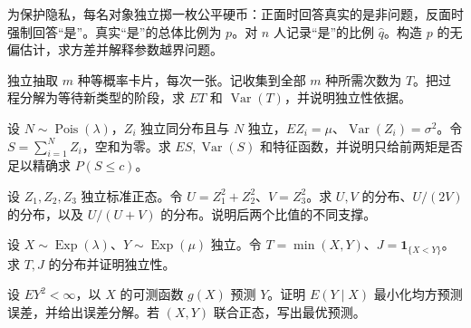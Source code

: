 \begin{exercise}[随机化回答的估计误差]\label{q:B17.3}
为保护隐私，每名对象独立掷一枚公平硬币：正面时回答真实的是非问题，反面时强制回答“是”。真实“是”的总体比例为 $p$。对 $n$ 人记录“是”的比例 $\widehat q$。构造 $p$ 的无偏估计，求方差并解释参数越界问题。\par{}\end{exercise}

\begin{exercise}[尾和公式与收集全套]\label{q:B17.4}
独立抽取 $m$ 种等概率卡片，每次一张。记收集到全部 $m$ 种所需次数为 $T$。把过程分解为等待新类型的阶段，求 $ET$ 和 $\operatorname{Var}(T)$，并说明独立性依据。\par{}\end{exercise}

\begin{exercise}[随机和的复合泊松结构]\label{q:B17.5}
设 $N\sim\operatorname{Pois}(\lambda)$，$Z_i$ 独立同分布且与 $N$ 独立，$EZ_i=\mu$、$\operatorname{Var}(Z_i)=\sigma^2$。令 $S=\sum_{i=1}^NZ_i$，空和为零。求 $ES,\operatorname{Var}(S)$ 和特征函数，并说明只给前两矩是否足以精确求 $P(S\le c)$。\par{}\end{exercise}

\begin{exercise}[正态变量平方和与比值]\label{q:B17.6}
设 $Z_1,Z_2,Z_3$ 独立标准正态。令 $U=Z_1^2+Z_2^2$、$V=Z_3^2$。求 $U,V$ 的分布、$U/(2V)$ 的分布，以及 $U/(U+V)$ 的分布。说明后两个比值的不同支撑。\par{}\end{exercise}

\begin{exercise}[指数竞争与获胜标记]\label{q:B17.7}
设 $X\sim\operatorname{Exp}(\lambda)$、$Y\sim\operatorname{Exp}(\mu)$ 独立。令 $T=\min(X,Y)$、$J=\mathbf1_{\{X<Y\}}$。求 $T,J$ 的分布并证明独立性。\par{}\end{exercise}

\begin{exercise}[条件期望作为最小平方预测]\label{q:B17.8}
设 $EY^2<\infty$，以 $X$ 的可测函数 $g(X)$ 预测 $Y$。证明 $E(Y\mid X)$ 最小化均方预测误差，并给出误差分解。若 $(X,Y)$ 联合正态，写出最优预测。\par{}\end{exercise}

